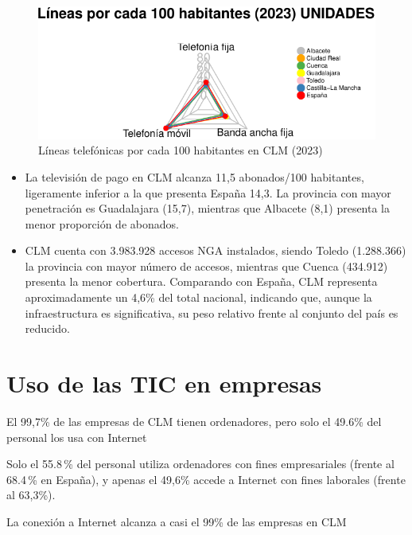 \documentclass[
  10pt,
  a4paper,
  DIV=11,
  numbers=noendperiod]{scrreprt}
\begin{document}
\begin{figure}

{\centering \includegraphics{clm01_ciencia_tecnologia_files/figure-pdf/teleco-clm-1.pdf}

}

\caption{Líneas telefónicas por cada 100 habitantes en CLM (2023)}

\end{figure}

\begin{itemize}
\item
  La televisión de pago en CLM alcanza 11,5 abonados/100 habitantes,
  ligeramente inferior a la que presenta España 14,3. La provincia con
  mayor penetración es Guadalajara (15,7), mientras que Albacete (8,1)
  presenta la menor proporción de abonados.
\item
  CLM cuenta con 3.983.928 accesos NGA instalados, siendo Toledo
  (1.288.366) la provincia con mayor número de accesos, mientras que
  Cuenca (434.912) presenta la menor cobertura. Comparando con España,
  CLM representa aproximadamente un 4,6\% del total nacional, indicando
  que, aunque la infraestructura es significativa, su peso relativo
  frente al conjunto del país es reducido.
\end{itemize}

\hypertarget{uso-de-las-tic-en-empresas}{%
\section{Uso de las TIC en empresas}\label{uso-de-las-tic-en-empresas}}

El 99,7\% de las empresas de CLM tienen ordenadores, pero solo el 49.6\%
del personal los usa con Internet

Solo el 55.8\,\% del personal utiliza ordenadores con fines
empresariales (frente al 68.4\,\% en España), y apenas el 49,6\% accede
a Internet con fines laborales (frente al 63,3\%).

\begin{tcolorbox}[enhanced jigsaw, leftrule=.75mm, breakable, toptitle=1mm, colframe=quarto-callout-note-color-frame, left=2mm, colback=white, bottomrule=.15mm, title=\textcolor{quarto-callout-note-color}{\faInfo}\hspace{0.5em}{Transformación digital y adopción tecnológica}, arc=.35mm, coltitle=black, colbacktitle=quarto-callout-note-color!10!white, toprule=.15mm, bottomtitle=1mm, opacityback=0, titlerule=0mm, rightrule=.15mm, opacitybacktitle=0.6]

La conexión a Internet alcanza a casi el 99\% de las empresas en CLM

\end{tcolorbox}
\end{document}
